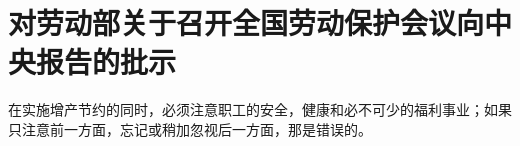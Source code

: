 \section[对劳动部关于召开全国劳动保护会议向中央报告的批示（一九五二年）]{对劳动部关于召开全国劳动保护会议向中央报告的批示}


在实施增产节约的同时，必须注意职工的安全，健康和必不可少的福利事业；如果只注意前一方面，忘记或稍加忽视后一方面，那是错误的。


